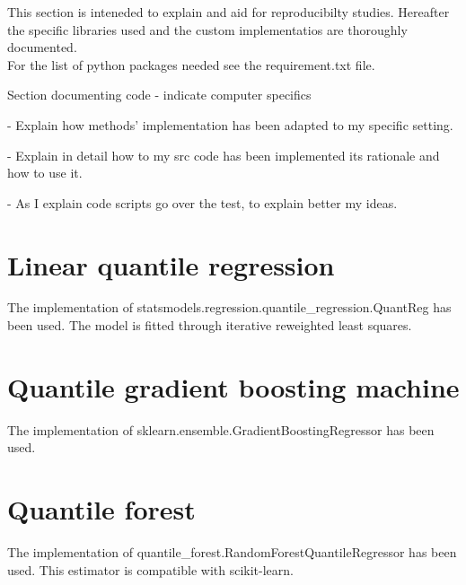 This section is inteneded to explain and aid for reproducibilty studies. Hereafter the specific libraries used and the custom implementatios are thoroughly documented.
\\
For the list of python packages needed see the requirement.txt file.


Section documenting code
- indicate computer specifics


- Explain how methods' implementation has been
adapted to my specific setting.

- Explain in detail how to my src code has been implemented
its rationale and how to use it.

- As I explain code scripts go over the test, to 
explain better my ideas.
\section{Linear quantile regression}
The implementation of statsmodels.regression.quantile\_regression.QuantReg has been used.
The model is fitted through iterative reweighted least squares.
\section{Quantile gradient boosting machine}
The implementation of sklearn.ensemble.GradientBoostingRegressor has been used.
\section{Quantile forest}
The implementation of quantile\_forest.RandomForestQuantileRegressor has been used. This estimator is compatible with scikit-learn.
